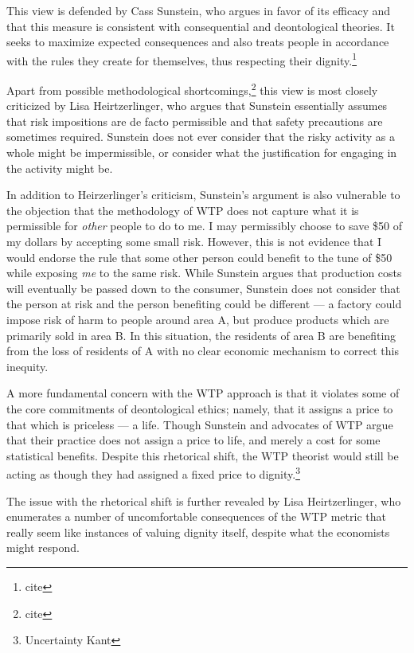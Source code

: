 This view is defended by Cass Sunstein, who argues in favor of its efficacy and
that this measure is consistent with consequential and deontological theories.
It seeks to maximize expected consequences and also treats people in accordance
with the rules they create for themselves, thus respecting their
dignity.\footnote{cite}

Apart from possible methodological shortcomings,\footnote{cite} this view is
most closely criticized by Lisa Heirtzerlinger, who argues that Sunstein
essentially assumes that risk impositions are de facto permissible and that
safety precautions are sometimes required. Sunstein does not ever consider that
the risky activity as a whole might be impermissible, or consider what the
justification for engaging in the activity might be.

In addition to Heirzerlinger’s criticism, Sunstein’s argument is also
vulnerable to the objection that the methodology of WTP does not capture what
it is permissible for \emph{other} people to do to me. I may permissibly choose
to save \$50 of my dollars by accepting some small risk. However, this is not
evidence that I would endorse the rule that some other person could benefit to
the tune of \$50 while exposing \emph{me} to the same
risk.\autocite[98]{hansson_risk} While Sunstein argues that production costs
will eventually be passed down to the consumer, Sunstein does not consider that
the person at risk and the person benefiting could be different --- a factory
could impose risk of harm to people around area A, but produce products which
are primarily sold in area B. In this situation, the residents of area B are
benefiting from the loss of residents of A with no clear economic mechanism to
correct this inequity.

A more fundamental concern with the WTP approach is that it violates some of
the core commitments of deontological ethics; namely, that it assigns a price
to that which is priceless --- a life. Though Sunstein and advocates of WTP
argue that their practice does not assign a price to life, and merely a cost
for some statistical benefits. Despite this rhetorical shift, the WTP theorist
would still be acting as though they had assigned a fixed price to
dignity.\footnote{Uncertainty Kant}

The issue with the rhetorical shift is further revealed by Lisa Heirtzerlinger,
who enumerates a number of uncomfortable consequences of the WTP metric that
really seem like instances of valuing dignity itself, despite what the
economists might respond.

